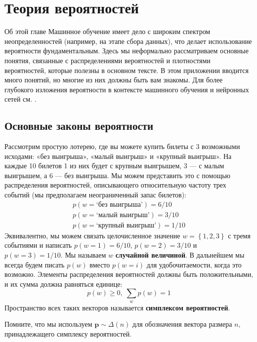 \chapter{Теория вероятностей}
\label{chap:probability_theory}

\begin{supportbox}{Об этой главе}
Машинное обучение имеет дело с широким спектром неопределенностей (например, на этапе сбора данных), что делает использование вероятности фундаментальным. Здесь мы неформально рассматриваем основные понятия, связанные с распределениями вероятностей и плотностями вероятностей, которые полезны в основном тексте. В этом приложении вводится много понятий, но многие из них должны быть вам знакомы. Для более глубокого изложения вероятности в контексте машинного обучения и нейронных сетей см. \cite{bishop2006pattern,bishop2024deep}.
\end{supportbox}

\section{Основные законы вероятности}

Рассмотрим простую лотерею, где вы можете купить билеты с 3 возможными исходами: «без выигрыша», «малый выигрыш» и «крупный выигрыш». На каждые 10 билетов 1 из них будет с крупным выигрышем, 3 — с малым выигрышем, а 6 — без выигрыша. Мы можем представить это с помощью распределения вероятностей, описывающего относительную частоту трех событий (мы предполагаем неограниченный запас билетов):
%
\begin{gather*}
p(w=\text{`без выигрыша'})=6/10 \\
p(w=\text{`малый выигрыш'})=3/10\\
p(w=\text{`крупный выигрыш'})=1/10
\end{gather*}
%
Эквивалентно, мы можем связать целочисленное значение $w=\left\{1,2,3\right\}$ с тремя событиями и написать $p(w=1)=6/10$, $p(w=2)=3/10$ и $p(w=3)=1/10$. Мы называем $w$ \textbf{случайной величиной}. В дальнейшем мы всегда будем писать $p(w)$ вместо $p(w=i)$ для удобочитаемости, когда это возможно. Элементы распределения вероятностей должны быть положительными, и их сумма должна равняться единице:
%
$$
p(w)\ge0,\;\sum_wp(w)=1
$$
%
Пространство всех таких векторов называется \textbf{симплексом вероятностей}. 

\begin{tcolorbox}
Помните, что мы используем $\mathbf{p} \sim \Delta(n)$ для обозначения вектора размера $n$, принадлежащего симплексу вероятностей. 
\end{tcolorbox}

